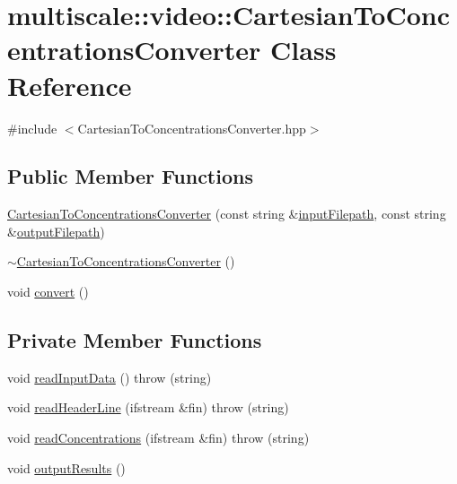 \hypertarget{classmultiscale_1_1video_1_1CartesianToConcentrationsConverter}{\section{multiscale\-:\-:video\-:\-:Cartesian\-To\-Concentrations\-Converter Class Reference}
\label{classmultiscale_1_1video_1_1CartesianToConcentrationsConverter}
}


{\ttfamily \#include $<$Cartesian\-To\-Concentrations\-Converter.\-hpp$>$}

\subsection*{Public Member Functions}
\begin{DoxyCompactItemize}
\item 
\hyperlink{classmultiscale_1_1video_1_1CartesianToConcentrationsConverter_ae2f641fe6c2af730a5aedc83f4bc1244}{Cartesian\-To\-Concentrations\-Converter} (const string \&\hyperlink{classmultiscale_1_1video_1_1CartesianToConcentrationsConverter_affebbc7e1c67692bd529f19fc0451e58}{input\-Filepath}, const string \&\hyperlink{classmultiscale_1_1video_1_1CartesianToConcentrationsConverter_a9215448e33876a581b206a89b6651fd0}{output\-Filepath})
\item 
\hyperlink{classmultiscale_1_1video_1_1CartesianToConcentrationsConverter_a4250cb00af6f3c254c0577479ae25553}{$\sim$\-Cartesian\-To\-Concentrations\-Converter} ()
\item 
void \hyperlink{classmultiscale_1_1video_1_1CartesianToConcentrationsConverter_a27de97c7e35097bd17453fd07f33a6f1}{convert} ()
\end{DoxyCompactItemize}
\subsection*{Private Member Functions}
\begin{DoxyCompactItemize}
\item 
void \hyperlink{classmultiscale_1_1video_1_1CartesianToConcentrationsConverter_a94094cdeaf0f48164911188709dc0e2f}{read\-Input\-Data} ()  throw (string)
\item 
void \hyperlink{classmultiscale_1_1video_1_1CartesianToConcentrationsConverter_a2e9967ae6fb2efc39ed377aca2fa222c}{read\-Header\-Line} (ifstream \&fin)  throw (string)
\item 
void \hyperlink{classmultiscale_1_1video_1_1CartesianToConcentrationsConverter_a9134409b814fafe62c896c6b473bc574}{read\-Concentrations} (ifstream \&fin)  throw (string)
\item 
void \hyperlink{classmultiscale_1_1video_1_1CartesianToConcentrationsConverter_a346e054266585ae6922d159b8d5fb804}{output\-Results} ()
\end{DoxyCompactItemize}
